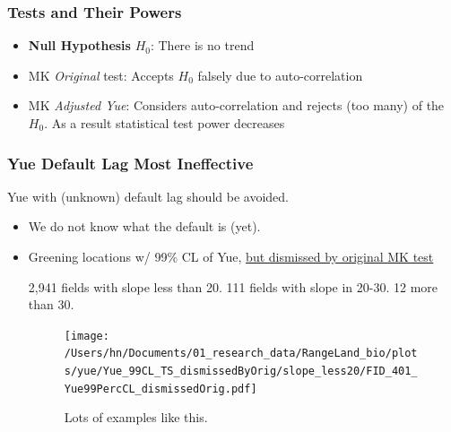 \documentclass[serif, xcolor={dvipsnames}]{beamer} %
\begin{document}

\begin{frame}
\frametitle{Tests and Their Powers}

\begin{itemize}%
\item {\bf Null Hypothesis}
$H_0$: There is no trend

\item MK {\color{red}\emph{Original}} test: Accepts $H_0$ falsely due to auto-correlation

\item MK {\color{red}\emph{Adjusted Yue}}: Considers auto-correlation and rejects (too many) of the $H_0$. 
As a result statistical test power decreases
\end{itemize}
\end{frame}

\begin{frame}[t]
\frametitle{Yue Default Lag Most Ineffective}
Yue with (unknown) default lag should be avoided.

\begin{itemize}
\item We do not know what the default is (yet).
\item Greening locations w/ 99\% CL of Yue, \href{https://drive.google.com/drive/folders/1zdI_G_knRYy8PrTnLBIbmaWOvfWqZUxV?usp=sharing}{but dismissed by original MK test}

{\tiny 2,941 fields with slope less than 20. 111 fields with slope in 20-30. 12 more than 30.}


\bigskip
\begin{figure}
\texttt{[image: /Users/hn/Documents/01\_research\_data/RangeLand\_bio/plots/yue/Yue\_99CL\_TS\_dismissedByOrig/slope\_less20/FID\_401\_Yue99PercCL\_dismissedOrig.pdf]}
\caption{Lots of examples like this.}
\end{figure}

\end{itemize}
\end{frame}
\end{document}
